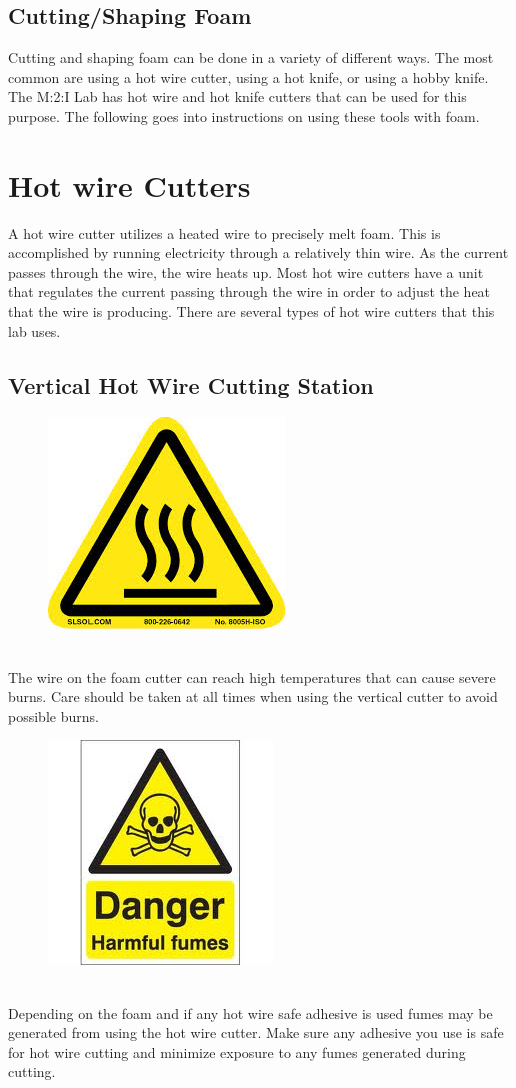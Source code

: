 \section{Cutting/Shaping Foam}
Cutting and shaping foam can be done in a variety of different ways. The most common are using a hot wire cutter, using a hot knife, or using a hobby knife.  The M:2:I Lab has hot wire and hot knife cutters that can be used for this purpose.  The following goes into instructions on using these tools with foam.

\chapter{Hot wire Cutters}
A hot wire cutter utilizes a heated wire to precisely melt foam. This is accomplished by running electricity through a relatively thin wire. As the current passes through the wire, the wire heats up. Most hot wire cutters have a unit that regulates the current passing through the wire in order to adjust the heat that the wire is producing. There are several types of hot wire cutters that this lab uses.

\section{Vertical Hot Wire Cutting Station}
\begin{framed}
\begin{figure}
\includegraphics[width=.7in]{images/burn_hazard}
\end{figure}
\ \\
The wire on the foam cutter can reach high temperatures that can cause severe burns.  Care should be taken at all times when using the vertical cutter to avoid possible burns.
\end{framed}

\begin{framed}
\begin{figure}
\includegraphics[width=.7in]{images/fumes_hazard}
\end{figure}
\ \\
Depending on the foam and if any hot wire safe adhesive is used fumes may be generated from using the hot wire cutter.  Make sure any adhesive you use is safe for hot wire cutting and minimize exposure to any fumes generated during cutting.
\end{framed}

